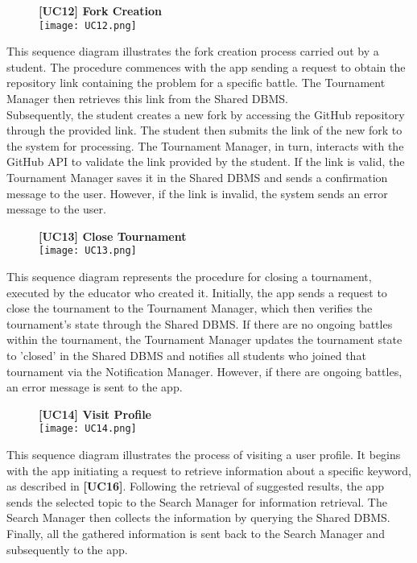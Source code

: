 \documentclass{article}
\begin{document}
\begin{figure}[H]
    \centering
    \textbf{[UC12] Fork Creation} \\
    \texttt{[image: UC12.png]}
\end{figure}
\noindent
This sequence diagram illustrates the fork creation process carried out by a student. The procedure commences with the app sending a request to obtain the repository link containing the problem for a specific battle. The Tournament Manager then retrieves this link from the Shared DBMS. \\
Subsequently, the student creates a new fork by accessing the GitHub repository through the provided link. The student then submits the link of the new fork to the system for processing. The Tournament Manager, in turn, interacts with the GitHub API to validate the link provided by the student. If the link is valid, the Tournament Manager saves it in the Shared DBMS and sends a confirmation message to the user. However, if the link is invalid, the system sends an error message to the user.

\begin{figure}[H]
    \centering
    \textbf{[UC13] Close Tournament} \\
    \texttt{[image: UC13.png]}
\end{figure}
\noindent
This sequence diagram represents the procedure for closing a tournament, executed by the educator who created it. Initially, the app sends a request to close the tournament to the Tournament Manager, which then verifies the tournament's state through the Shared DBMS. If there are no ongoing battles within the tournament, the Tournament Manager updates the tournament state to 'closed' in the Shared DBMS and notifies all students who joined that tournament via the Notification Manager. However, if there are ongoing battles, an error message is sent to the app.

\begin{figure}[H]
    \centering
    \textbf{[UC14] Visit Profile} \\
    \texttt{[image: UC14.png]}
\end{figure}
\noindent
This sequence diagram illustrates the process of visiting a user profile. It begins with the app initiating a request to retrieve information about a specific keyword, as described in \textbf{[UC16]}. Following the retrieval of suggested results, the app sends the selected topic to the Search Manager for information retrieval. The Search Manager then collects the information by querying the Shared DBMS. Finally, all the gathered information is sent back to the Search Manager and subsequently to the app.
\end{document}

